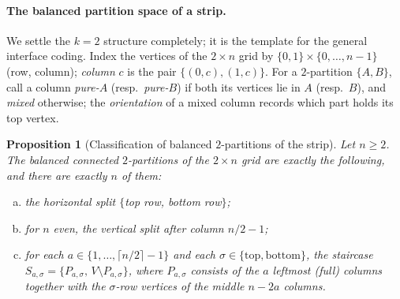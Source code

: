 \documentclass[11pt]{article}
\newtheorem{proposition}[theorem]{Proposition}
\begin{document}
\paragraph{The balanced partition space of a strip.} We settle the $k = 2$
structure completely; it is the template for the general interface coding.
Index the vertices of the $2 \times n$ grid by $\{0,1\} \times \{0, \ldots,
n-1\}$ (row, column); \emph{column} $c$ is the pair $\{(0,c), (1,c)\}$. For
a $2$-partition $\{A, B\}$, call a column \emph{pure-$A$}
(resp.\ \emph{pure-$B$}) if both its vertices lie in $A$ (resp.\ $B$), and
\emph{mixed} otherwise; the \emph{orientation} of a mixed column records
which part holds its top vertex.

\begin{proposition}[Classification of balanced $2$-partitions of the strip]
\label{prop:strip-classify}
Let $n \ge 2$. The balanced connected $2$-partitions of the $2 \times n$
grid are exactly the following, and there are exactly $n$ of them:
\begin{enumerate}[(a)]
  \item the horizontal split $\{$top row, bottom row$\}$;
  \item for $n$ even, the vertical split after column $n/2 - 1$;
  \item for each $a \in \{1, \ldots, \lceil n/2 \rceil - 1\}$ and each
    $\sigma \in \{\mathrm{top}, \mathrm{bottom}\}$, the \emph{staircase}
    $S_{a,\sigma} = \{P_{a,\sigma},\, V \setminus P_{a,\sigma}\}$, where
    $P_{a,\sigma}$ consists of the $a$ leftmost (full) columns together
    with the $\sigma$-row vertices of the middle $n - 2a$ columns.
\end{enumerate}
\end{proposition}
\end{document}
